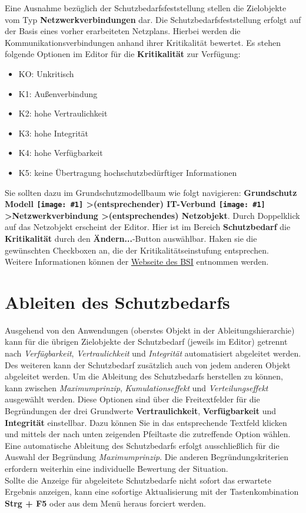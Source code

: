 \documentclass[a4paper,10pt]{book}
\newcommand{\icon}[1]{\texttt{[image: \#1]}}
\begin{document}
Eine Ausnahme bezüglich der Schutzbedarfsfeststellung stellen die Zielobjekte vom Typ \textbf{Netzwerkverbindungen} dar. Die Schutzbedarfsfeststellung erfolgt auf der Basis eines vorher erarbeiteten Netzplans. Hierbei werden die Kommunikationsverbindungen anhand ihrer Kritikalität bewertet. Es stehen folgende Optionen im Editor für die \textbf{Kritikalität} zur Verfügung:
\begin{itemize}
 \item KO: Unkritisch
 \item K1: Außenverbindung
 \item K2: hohe Vertraulichkeit
 \item K3: hohe Integrität
 \item K4: hohe Verfügbarkeit
 \item K5: keine Übertragung hochschutzbedürftiger Informationen
\end{itemize}
Sie sollten dazu im Grundschutzmodellbaum wie folgt navigieren: \textbf{Grundschutz Modell
\icon{Icon/GS_Modell.png} \textgreater (entsprechender) IT-Verbund \icon{Icon/GS_Modell.png}
\textgreater Netzwerkverbindung \textgreater (entsprechendes) Netzobjekt}. Durch Doppelklick auf das Netzobjekt erscheint der Editor.
Hier ist im Bereich \textbf{Schutzbedarf} die \textbf{Kritikalität} durch den \textbf{Ändern...}-Button auswählbar.
Haken sie die gewünschten Checkboxen an, die der Kritikalitätseinstufung entsprechen.
\newline\\
Weitere Informationen können der \href{https://www.bsi.bund.de/cln_156/ContentBSI/grundschutz/webkurs/gskurs/seiten/s4000_htm.html}{Webseite des BSI}
entnommen werden.

\section{Ableiten des Schutzbedarfs}
Ausgehend von den Anwendungen (oberstes Objekt in der Ableitungshierarchie) kann für die übrigen Zielobjekte der Schutzbedarf (jeweils im Editor) getrennt nach \textit{Verfügbarkeit}, \textit{Vertraulichkeit} und \textit{Integrität} automatisiert abgeleitet werden. Des weiteren kann der Schutzbedarf zusätzlich auch von jedem anderen Objekt abgeleitet werden.
Um die Ableitung des Schutzbedarfs herstellen zu können, kann zwischen \textit{Maximumprinzip}, \textit{Kumulationseffekt} und \textit{Verteilungseffekt} ausgewählt werden. Diese Optionen sind über die Freitextfelder für die Begründungen der drei Grundwerte \textbf{Vertraulichkeit}, \textbf{Verfügbarkeit} und \textbf{Integrität} einstellbar. Dazu können Sie in das entsprechende Textfeld klicken und mittels der nach unten zeigenden Pfeiltaste die zutreffende Option wählen.
Eine automatische Ableitung des Schutzbedarfs erfolgt ausschließlich für die Auswahl der Begründung \textit{Maximumprinzip}. Die anderen Begründungskriterien erfordern weiterhin eine individuelle Bewertung der Situation.
\newline\\
Sollte die Anzeige für abgeleitete Schutzbedarfe nicht sofort das erwartete Ergebnis anzeigen, kann eine sofortige Aktualisierung mit der Tastenkombination \textbf{Strg + F5} oder aus dem Menü heraus forciert werden.
\end{document}
